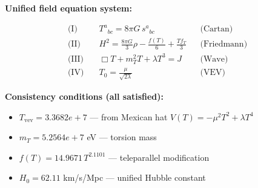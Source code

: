 
\textbf{Unified field equation system:}

\begin{align}
  \text{(I)} \quad & T^a{}_{bc} = 8\pi G \, s^a{}_{bc} && \text{(Cartan)} \\
  \text{(II)} \quad & H^2 = \frac{8\pi G}{3}\rho - \frac{f(T)}{6} + \frac{Tf_T}{3} && \text{(Friedmann)} \\
  \text{(III)} \quad & \Box T + m_T^2 T + \lambda T^3 = J && \text{(Wave)} \\
  \text{(IV)} \quad & T_0 = \frac{\mu}{\sqrt{2\lambda}} && \text{(VEV)}
\end{align}

\textbf{Consistency conditions (all satisfied):}
\begin{itemize}
  \item $T_{\text{vev}} = 3.3682e+7$ — from Mexican hat $V(T) = -\mu^2 T^2 + \lambda T^4$
  \item $m_T = 5.2564e+7$ eV — torsion mass
  \item $f(T) = 14.9671 \, T^{2.1101}$ — teleparallel modification
  \item $H_0 = 62.11$ km/s/Mpc — unified Hubble constant
\end{itemize}